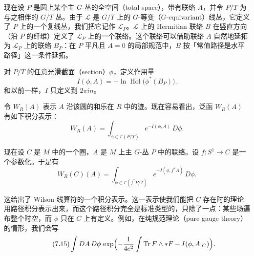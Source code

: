 现在设 $P$ 是圆上某个主 $G$-丛的全空间（total space），带有联络 $A$，并令 $P/T$ 为与之相伴的 $G/T$ 丛。由于 $\mathcal{L}$ 是 $G/T$ 上的 $G$-等变（$G$-equivariant）线丛，它定义了 $P$ 上的一个复线丛，我们把它记作 $\mathcal{L}_P$。$\mathcal{L}$ 上的 Hermitian 联络 $B$ 在竖直方向（沿 $P$ 的纤维）定义了 $\mathcal{L}_P$ 上的一个联络。这个联络可以借助联络 $A$ 自然地延拓为 $\mathcal{L}_P$ 上的联络 $B_P$：在 $P$ 平凡且 $A=0$ 的局部规范中，$B$ 按「常值路径是水平路径」这一条件延拓。

对 $P/T$ 的任意光滑截面（section）$\phi$，定义作用量
\begin{equation}
  \tag{7.12}
  \label{eq:7-12}
  I(\phi,A)=-\ln\operatorname{Hol}\bigl(\phi^*(B_P)\bigr) .
\end{equation}
和以前一样，$I$ 只定义到 $2\pi i n$。

令 $W_R(A)$ 表示 $A$ 沿该圆的和乐在 $R$ 中的迹。现在容易看出，泛函 $W_R(A)$ 有如下积分表示：
\begin{equation}
  \tag{7.13}
  \label{eq:7-13}
  W_R(A)=\int_{\phi\in\Gamma(P/T)}e^{-I(\phi,A)}\,D\phi .
\end{equation}


现在设 $C$ 是 $M$ 中的一个圈，$A$ 是 $M$ 上主 $G$-丛 $P$ 中的联络。设 $f:S^1\to C$ 是一个参数化。于是有
\begin{equation}
  \tag{7.14}
  \label{eq:7-14}
  W_R(C)(A)=\int_{\phi\in\Gamma(f^*P/T)}e^{-I(\phi,f^*A)}\,D\phi .
\end{equation}

这给出了 Wilson 线算符的一个积分表示。这一表示使我们能把 $C$ 存在时的理论用路径积分表示出来，而这个路径积分完全是标准类型的，只除了一点：某些场遍布整个时空，而 $\phi$ 只在 $C$ 上有定义。例如，在纯规范理论（pure gauge theory）的情形，我们会写
\begin{equation}
  \tag{7.15}
  \label{eq:7-15}
  \int DA\,D\phi\,\exp\Bigl(-\frac{1}{4e^2}\int\operatorname{Tr}F\wedge *F-I(\phi,A|_C)\Bigr) .
\end{equation}

